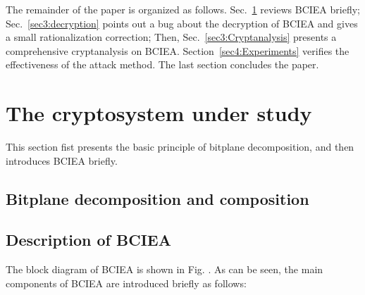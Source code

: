 \documentclass[final,3p,times,twocolumn]{elsarticle}
\begin{document}
The remainder of the paper is organized as follows. Sec.~\ref{sec2:BCIEA} reviews BCIEA briefly;
Sec.~\ref{sec3:decryption} points out a bug about the decryption of BCIEA and gives a small rationalization correction;
Then, Sec.~\ref{sec3:Cryptanalysis} presents a comprehensive cryptanalysis on BCIEA. 
Section~\ref{sec4:Experiments} verifies the effectiveness of the attack method. The last section concludes the paper.

\section{The cryptosystem under study}
\label{sec2:BCIEA}

This section fist presents the basic principle of bitplane decomposition, and then introduces BCIEA briefly.

\subsection{Bitplane decomposition and composition}



\subsection{Description of BCIEA}

The block diagram of BCIEA is shown in Fig. . As can be seen, the main components of BCIEA are introduced briefly as follows:


\end{document}
